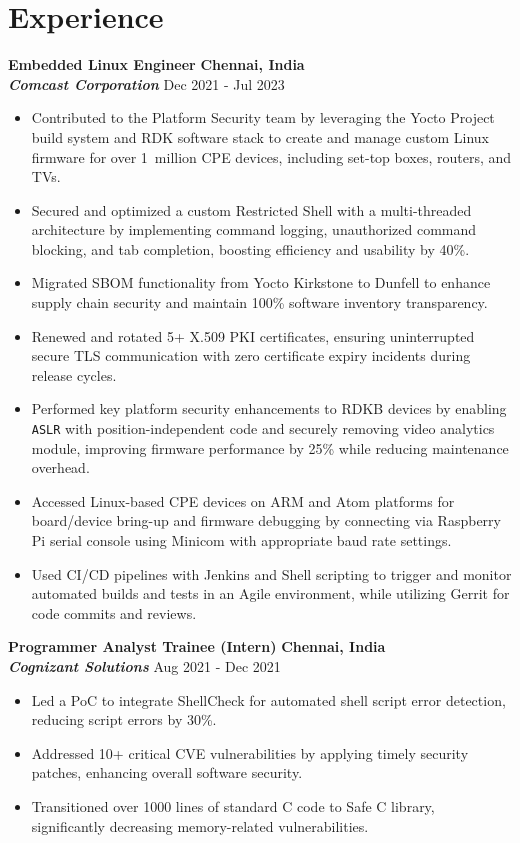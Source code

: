 \documentclass[10pt, letterpad, sans]{extarticle}
\newcommand{\cmpnysection}[4] {
	\raggedright{\normalsize\bfseries{#3}}
	\hfill {\small \textbf{#2}} \\
	{\textit{\bfseries #1}}
	\hfill {\small #4} \\
}
\begin{document}
\section{Experience}
\vspace*{0.5em}
\cmpnysection
{Comcast Corporation}
{Chennai, India}
{Embedded Linux Engineer}
{Dec 2021 - Jul 2023}
\begin{itemize}[leftmargin=6mm]
	\item{Contributed to the Platform Security team by leveraging the Yocto Project build system and RDK software stack to create and manage custom Linux firmware for over \mbox{1 million} CPE devices, including set-top boxes, routers, and TVs.}
	\item {Secured and optimized a custom Restricted Shell with a multi-threaded architecture by implementing command logging, unauthorized command blocking, and tab completion, boosting efficiency and usability by 40\%.}
	\item{Migrated SBOM functionality from Yocto Kirkstone to Dunfell to enhance supply chain security and maintain 100\% software inventory transparency.}
	\item{Renewed and rotated 5+ X.509 PKI certificates, ensuring uninterrupted secure TLS communication with zero certificate expiry incidents during release cycles.}
	\item{Performed key platform security enhancements to RDKB devices by enabling \texttt{ASLR} with position-independent code and securely removing video analytics module, improving firmware performance by 25\% while reducing maintenance overhead.}
	\item{Accessed Linux-based CPE devices on ARM and Atom platforms for board/device bring-up and firmware debugging by connecting via Raspberry Pi serial console using Minicom with appropriate baud rate settings.}
	\item{Used CI/CD pipelines with Jenkins and Shell scripting to trigger and monitor automated builds and tests in an Agile environment, while utilizing Gerrit for code commits and reviews.}
\end{itemize}

\vspace*{0.5em}
\cmpnysection
{Cognizant Solutions}
{Chennai, India}
{Programmer Analyst Trainee (Intern)}
{Aug 2021 - Dec 2021}
\begin{itemize}[leftmargin=6mm]
	\item{Led a PoC to integrate ShellCheck for automated shell script error detection, reducing script errors by 30\%.}
	\item{Addressed 10+ critical CVE vulnerabilities by applying timely security patches, enhancing overall software security.}
	\item{Transitioned over 1000 lines of standard C code to Safe C library, significantly decreasing memory-related vulnerabilities.}
\end{itemize}
\end{document}
